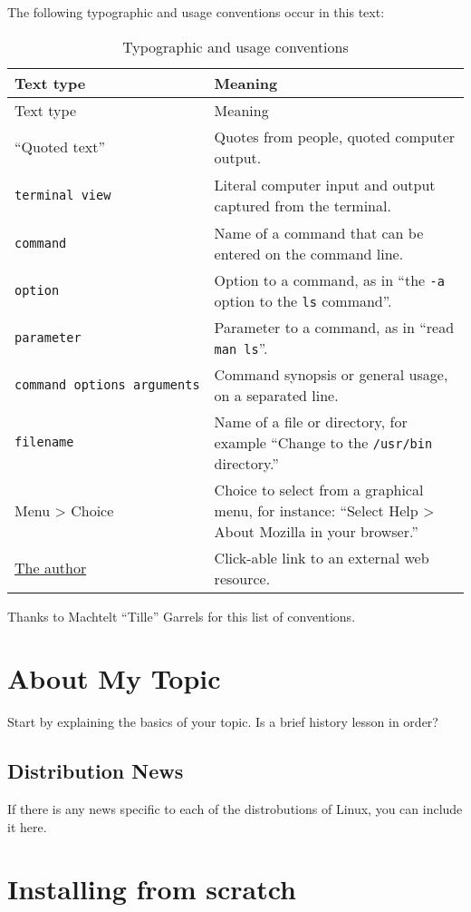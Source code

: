 The following typographic and usage conventions occur in this text:

\begin{longtable}[c]{@{}ll@{}}
\caption{Typographic and usage conventions}\tabularnewline
\toprule
Text type & Meaning\tabularnewline
\midrule
\endfirsthead
\toprule
Text type & Meaning\tabularnewline
\midrule
\endhead
``Quoted text'' & Quotes from people, quoted computer
output.\tabularnewline
\begin{verbatim}
terminal view
\end{verbatim}
 & Literal computer input and output captured from the
terminal.\tabularnewline
\texttt{command} & Name of a command that can be entered on the command
line.\tabularnewline
\texttt{option} & Option to a command, as in ``the \texttt{-a} option to
the \texttt{ls} command''.\tabularnewline
\texttt{parameter} & Parameter to a command, as in ``read
\texttt{man\ ls}''.\tabularnewline
\texttt{command\ options\ 
arguments} & Command synopsis or general usage, on a separated
line.\tabularnewline
\texttt{filename} & Name of a file or directory, for example ``Change to
the \texttt{/usr/bin} directory.''\tabularnewline
{Menu \textgreater{} Choice} & Choice to select from a graphical menu,
for instance: ``Select {Help \textgreater{} About Mozilla} in your
browser.''\tabularnewline
\href{http://www.xtrinsic.com}{The author} & Click-able link to an
external web resource.\tabularnewline
\bottomrule
\end{longtable}

Thanks to Machtelt ``Tille'' Garrels for this list of conventions.

\section{About My Topic}\label{about}

Start by explaining the basics of your topic. Is a brief history lesson
in order?

\subsection{Distribution News}\label{distro-news}

If there is any news specific to each of the distrobutions of Linux, you
can include it here.

\section{Installing from scratch}\label{install}

